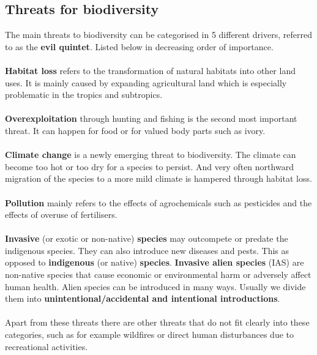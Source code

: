 \documentclass[../summary.tex]{subfiles}
\begin{document}
\subsection{Threats for biodiversity}
The main threats to biodiversity can be categorised in 5 different drivers, referred to as the \textbf{evil quintet}. Listed below in decreasing order of importance.
\\\\
\textbf{Habitat loss} refers to the transformation of natural habitats into other land uses. It is mainly caused by expanding agricultural land which is especially problematic in the tropics and subtropics.
\\\\
\textbf{Overexploitation} through hunting and fishing is the second most important threat. It can happen for food or for valued body parts such as ivory.
\\\\
\textbf{Climate change} is a newly emerging threat to biodiversity. The climate can become too hot or too dry for a species to persist. And very often northward migration of the species to a more mild climate is hampered through habitat loss.
\\\\
\textbf{Pollution} mainly refers to the effects of agrochemicals such as pesticides and the effects of overuse of fertilisers.
\\\\
\textbf{Invasive} (or exotic or non-native) \textbf{species} may outcompete or predate the indigenous species. They can also introduce new diseases and pests. This as opposed to \textbf{indigenous} (or native) \textbf{species}.
\textbf{Invasive alien species} (IAS) are non-native species that cause economic or environmental harm or adversely affect human health.
Alien species can be introduced in many ways. Usually we divide them into \textbf{unintentional/accidental and intentional introductions}.
\\\\
Apart from these threats there are other threats that do not fit clearly into these categories, such as for example wildfires or direct human disturbances due to recreational activities.
\end{document}
